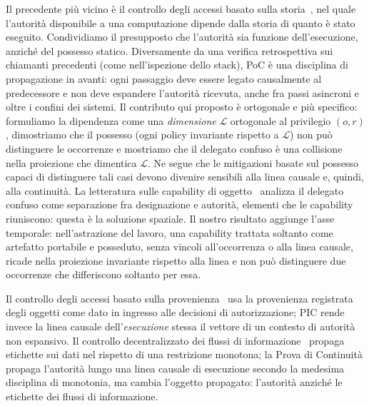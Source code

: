 \documentclass[11pt]{article}
\begin{document}
Il precedente più vicino è il controllo degli accessi basato sulla
storia~\cite{abadi2003history}, nel quale l'autorità disponibile a una
computazione dipende dalla storia di quanto è stato eseguito. Condividiamo il
presupposto che l'autorità sia funzione dell'esecuzione, anziché del possesso
statico. Diversamente da una verifica retrospettiva sui chiamanti precedenti
(come nell'ispezione dello stack), PoC è una disciplina di propagazione in
avanti: ogni passaggio deve essere legato causalmente al predecessore e non deve
espandere l'autorità ricevuta, anche fra passi asincroni e oltre i confini dei
sistemi. Il contributo qui proposto è ortogonale e più specifico: formuliamo la
dipendenza come una \emph{dimensione} $\mathcal{L}$ ortogonale al privilegio
$(o,r)$, dimostriamo che il possesso (ogni policy invariante rispetto a
$\mathcal{L}$) non può distinguere le occorrenze e mostriamo che il delegato
confuso è una collisione nella proiezione che dimentica $\mathcal{L}$. Ne segue
che le mitigazioni basate sul possesso capaci di distinguere tali casi devono
divenire sensibili alla linea causale e, quindi, alla continuità. La letteratura
sulle capability di oggetto~\cite{miller2006robust} analizza il delegato confuso
come separazione fra designazione e autorità, elementi che le capability
riuniscono: questa è la soluzione spaziale. Il nostro risultato aggiunge l'asse
temporale: nell'astrazione del lavoro, una capability trattata soltanto come
artefatto portabile e posseduto, senza vincoli all'occorrenza o alla linea
causale, ricade nella proiezione invariante rispetto alla linea e non può
distinguere due occorrenze che differiscono soltanto per essa.

Il controllo degli accessi basato sulla
provenienza~\cite{park2012provenance} usa la provenienza registrata degli oggetti
come dato in ingresso alle decisioni di autorizzazione; PIC rende invece la
linea causale dell'\emph{esecuzione} stessa il vettore di un contesto di autorità
non espansivo. Il controllo decentralizzato dei flussi di
informazione~\cite{myers1997decentralized} propaga etichette sui dati nel
rispetto di una restrizione monotona; la Prova di Continuità propaga l'autorità
lungo una linea causale di esecuzione secondo la medesima disciplina di
monotonia, ma cambia l'oggetto propagato: l'autorità anziché le etichette dei
flussi di informazione.
\end{document}
